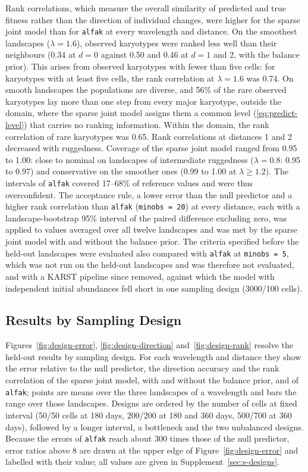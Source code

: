 \documentclass[11pt]{article}
\begin{document}
Rank correlations, which measure the overall similarity of predicted and true
fitness rather than the direction of individual changes, were higher for the
sparse joint model than for \texttt{alfak} at every wavelength and distance.
On the smoothest landscapes ($\lambda=1.6$), observed karyotypes were ranked
less well than their neighbours (0.34 at $d=0$ against 0.50 and 0.46 at
$d=1$ and 2, with the balance prior). This arises from observed karyotypes
with fewer than five cells: for karyotypes with at least five cells, the rank
correlation at $\lambda=1.6$ was 0.74. On smooth landscapes the populations
are diverse, and 56\% of the rare observed karyotypes lay more than one step
from every major karyotype, outside the domain, where the sparse joint model
assigns them a common level (\ref{eq:predict-level}) that carries no ranking
information. Within the domain, the rank correlation of rare karyotypes was
0.65. Rank correlations at distances 1 and 2 decreased with ruggedness. Coverage of the sparse joint model
ranged from 0.95 to 1.00: close to nominal on landscapes of intermediate
ruggedness ($\lambda=0.8$: 0.95 to 0.97) and conservative on the smoother
ones (0.99 to 1.00 at $\lambda\ge1.2$).
The intervals of \texttt{alfak} covered 17--68\% of reference values and
were thus overconfident. The acceptance rule, a lower error than the null
predictor and a higher rank correlation than \texttt{alfak}
(\texttt{minobs = 20}) at every distance, each with a landscape-bootstrap
95\% interval of the paired difference excluding zero, was applied to values
averaged over all twelve landscapes and was met by the sparse joint model with
and without the balance prior. The criteria specified before the held-out
landscapes were evaluated also compared with \texttt{alfak} at
\texttt{minobs = 5}, which was not run on the held-out landscapes and was
therefore not evaluated, and with a KARST pipeline since removed, against
which the model with independent initial abundances fell short in one
sampling design (3000/100 cells).

\subsection{Results by Sampling Design}
\label{sec:val-sampling}

Figures~\ref{fig:design-error}, \ref{fig:design-direction}
and~\ref{fig:design-rank} resolve the held-out results by sampling design.
For each wavelength and distance they show the error relative to the null
predictor, the direction accuracy and the rank correlation of the sparse
joint model, with and without the balance prior, and of \texttt{alfak}; points are means over the three landscapes of a
wavelength and bars the range over those landscapes. Designs are ordered by the number of cells at fixed
interval (50/50 cells at 180 days, 200/200 at 180 and 360 days, 500/700 at 360
days), followed by a longer interval, a bottleneck and the two unbalanced
designs. Because the errors of \texttt{alfak} reach about 300 times those of
the null predictor, error ratios above 8 are drawn at the upper edge of
Figure~\ref{fig:design-error} and labelled with their value; all values are
given in Supplement~\ref{sec:s-designs}.
\end{document}
